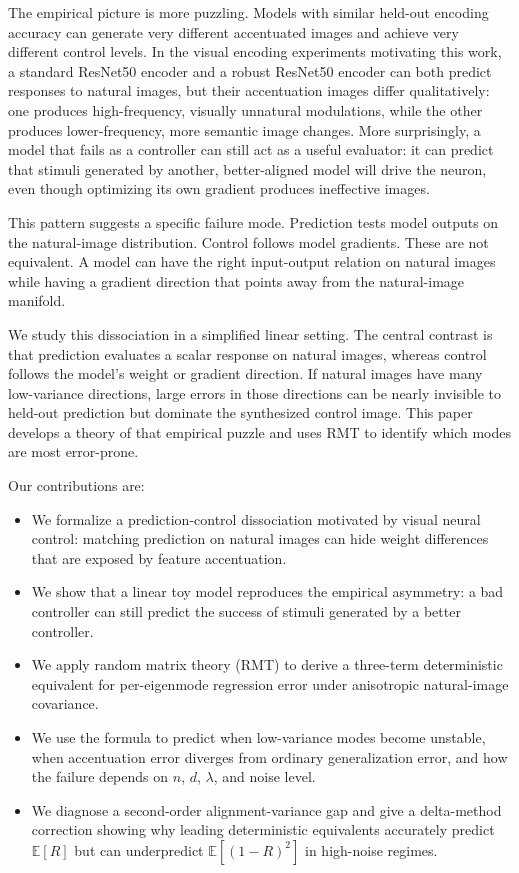 \documentclass{article}
\begin{document}
The empirical picture is more puzzling. Models with similar held-out encoding accuracy can generate very different accentuated images and achieve very different control levels. In the visual encoding experiments motivating this work, a standard ResNet50 encoder and a robust ResNet50 encoder can both predict responses to natural images, but their accentuation images differ qualitatively: one produces high-frequency, visually unnatural modulations, while the other produces lower-frequency, more semantic image changes. More surprisingly, a model that fails as a controller can still act as a useful evaluator: it can predict that stimuli generated by another, better-aligned model will drive the neuron, even though optimizing its own gradient produces ineffective images.

This pattern suggests a specific failure mode. Prediction tests model outputs on the natural-image distribution. Control follows model gradients. These are not equivalent. A model can have the right input-output relation on natural images while having a gradient direction that points away from the natural-image manifold.

We study this dissociation in a simplified linear setting. The central contrast is that prediction evaluates a scalar response on natural images, whereas control follows the model's weight or gradient direction. If natural images have many low-variance directions, large errors in those directions can be nearly invisible to held-out prediction but dominate the synthesized control image. This paper develops a theory of that empirical puzzle and uses RMT to identify which modes are most error-prone.

Our contributions are:
\begin{itemize}
    \item We formalize a prediction-control dissociation motivated by visual neural control: matching prediction on natural images can hide weight differences that are exposed by feature accentuation.
    \item We show that a linear toy model reproduces the empirical asymmetry: a bad controller can still predict the success of stimuli generated by a better controller.
    \item We apply random matrix theory (RMT) to derive a three-term deterministic equivalent for per-eigenmode regression error under anisotropic natural-image covariance.
    \item We use the formula to predict when low-variance modes become unstable, when accentuation error diverges from ordinary generalization error, and how the failure depends on $n$, $d$, $\lambda$, and noise level.
    \item We diagnose a second-order alignment-variance gap and give a delta-method correction showing why leading deterministic equivalents accurately predict $\mathbb{E}[R]$ but can underpredict $\mathbb{E}[(1-R)^2]$ in high-noise regimes.
\end{itemize}
\end{document}
